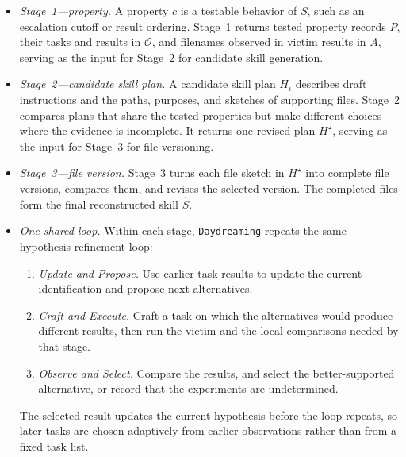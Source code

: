 \documentclass[letterpaper,twocolumn,10pt]{article}
\newcommand{\method}{\texttt{Daydreaming}\xspace}
\begin{document}
\begin{itemize}
  \item \emph{Stage~1---property.}  A property $c$ is a testable behavior of $S$,
        such as an escalation cutoff or result ordering.  Stage~1 returns
        tested property records $P$, their tasks and results in $\mathcal{O}$,
        and filenames observed in victim results in $A$, 
        serving as the input for Stage~2 for candidate skill generation.
  \item \emph{Stage~2---candidate skill plan.}  A candidate skill plan $H_i$
        describes draft instructions and the paths, purposes, and sketches of
        supporting files.  Stage~2 compares plans that share the tested
        properties but make different choices where the evidence is incomplete.
        It returns one revised plan $H^\star$, serving as the input for Stage~3 for file versioning.
  \item \emph{Stage~3---file version.}  Stage~3 turns each file sketch in
        $H^\star$ into complete file versions, compares them, and revises the
        selected version.  The completed files form the final reconstructed skill $\widehat{S}$.
    \item \emph{One shared loop.} Within each stage, \method repeats the same
      hypothesis-refinement loop:
      \begin{enumerate}
      \item \emph{Update and Propose.}  Use earlier task results to update the
            current identification and propose next alternatives.
      \item \emph{Craft and Execute.}  Craft a task on which the alternatives
            would produce different results, then run the victim and the local
            comparisons needed by that stage.
      \item \emph{Observe and Select.}  Compare the results, and select the
            better-supported alternative, or record that the experiments are undetermined.
    \end{enumerate}
    The selected result updates the current hypothesis before the loop repeats, so later tasks are chosen adaptively from earlier observations rather than from a fixed task list.
\end{itemize}
\end{document}
